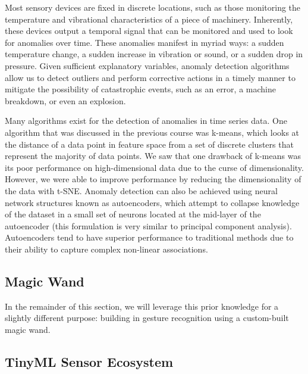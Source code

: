 Most sensory devices are fixed in discrete locations, such as those monitoring the temperature and vibrational characteristics of a piece of machinery. Inherently, these devices output a temporal signal that can be monitored and used to look for anomalies over time. These anomalies manifest in myriad ways: a sudden temperature change, a sudden increase in vibration or sound, or a sudden drop in pressure. Given sufficient explanatory variables, anomaly detection algorithms allow us to detect outliers and perform corrective actions in a timely manner to mitigate the possibility of catastrophic events, such as an error, a machine breakdown, or even an explosion.

Many algorithms exist for the detection of anomalies in time series data. One algorithm that was discussed in the previous course was k-means, which looks at the distance of a data point in feature space from a set of discrete clusters that represent the majority of data points. We saw that one drawback of k-means was its poor performance on high-dimensional data due to the curse of dimensionality. However, we were able to improve performance by reducing the dimensionality of the data with t-SNE. Anomaly detection can also be achieved using neural network structures known as autoencoders, which attempt to collapse knowledge of the dataset in a small set of neurons located at the mid-layer of the autoencoder (this formulation is very similar to principal component analysis). Autoencoders tend to have superior performance to traditional methods due to their ability to capture complex non-linear associations.

\subsection{Magic Wand}

In the remainder of this section, we will leverage this prior knowledge for a slightly different purpose: building in gesture recognition using a custom-built magic wand.

\subsection{TinyML Sensor Ecosystem}

